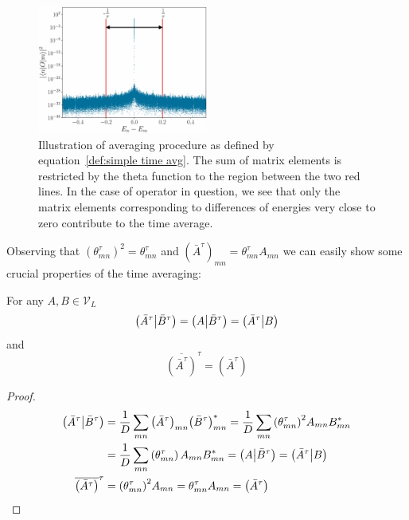 \begin{figure}[htbp]
  \centering
  \includegraphics[width=0.5\textwidth]{Figures/cutoff_flat.pdf}
  \caption{Illustration of averaging procedure as defined by equation~\eqref{def:simple time avg}. The sum
  of matrix elements is restricted by the theta function to the region between the two red lines. In the case
  of operator in question, we see that only the matrix elements corresponding to differences of energies
  very close to zero contribute to the time average. }
  \label{fig:cutoff}
\end{figure}


Observing that \({\left(\theta_{mn}^{\tau}\right)}^2 = \theta_{mn}^{\tau}\) and \({\left(\bar{A}^{\tau}\right)}_{mn} =
\theta_{mn}^{\tau} A_{mn}\) we can easily show some crucial properties of the time averaging:
\begin{proposition}
  For any \(A,B \in \mathcal{V}_L\)
  \begin{equation*}
    \left(\bar{A}^{\tau} \middle| \bar{B}^{\tau}\right) = \left(A \middle| \bar{B}^{\tau}\right) = \left(\bar{A}^{\tau} \middle| B\right)
  \end{equation*}
  and
  \begin{equation*}
    \overline{\left(\bar{A}^{\tau}\right)}^{\tau} = \left(\bar{A}^{\tau}\right)
  \end{equation*}
  \label{prop:projection}
\end{proposition}

\begin{proof}
  \begin{align*}
    \left(\bar{A}^{\tau} \middle| \bar{B}^{\tau}\right)  & = \frac{1}{D} \sum_{mn} {\left(\bar{A}^{\tau}\right)}_{mn}
    {\left(\bar{B}^{\tau}\right)}_{mn}^{\ast} = \frac{1}{D} \sum_{mn} {\left(\theta_{mn}^{\tau}\right)}^2 A_{mn} B_{mn}^{\ast} \nonumber{}               \\
    & = \frac{1}{D} \sum_{mn} \left(\theta_{mn}^{\tau}\right) A_{mn} B_{mn}^{\ast} =
    \left(A \middle| \bar{B}^{\tau}\right) = \left(\bar{A}^{\tau} \middle| B\right)                                                                                                        \\
    \overline{\left(\bar{A}^{\tau}\right)}^{\tau} & = {\left(\theta_{mn}^{\tau}\right)}^2 A_{mn} = \theta_{mn}^{\tau} A_{mn} = \left(\bar{A}^{\tau}\right)
  \end{align*}
  
\end{proof}

